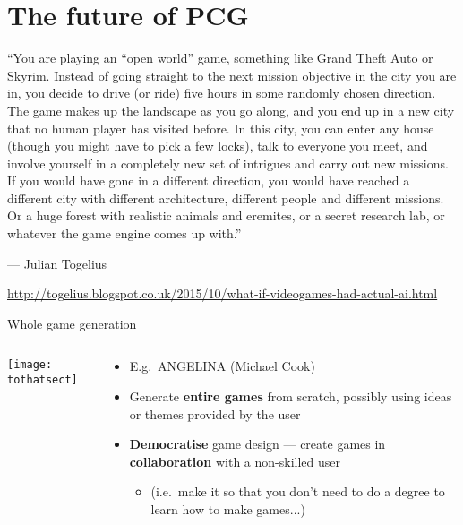 \part{The future of PCG}
\frame{\partpage}

\begin{frame}
``You are playing an ``open world'' game, something like Grand Theft Auto or Skyrim.
Instead of going straight to the next mission objective in the city you are in,
you decide to drive (or ride) five hours in some randomly chosen direction.
The game makes up the landscape as you go along, and you end up in a new city that no human player has visited before.
In this city, you can enter any house (though you might have to pick a few locks), talk to everyone you meet,
and involve yourself in a completely new set of intrigues and carry out new missions.
If you would have gone in a different direction, you would have reached a different city
with different architecture, different people and different missions.
Or a huge forest with realistic animals and eremites, or a secret research lab, or whatever the game engine comes up with.''

--- Julian Togelius

{\tiny\url{http://togelius.blogspot.co.uk/2015/10/what-if-videogames-had-actual-ai.html}}
\end{frame}

\begin{frame}{Whole game generation}
	\begin{columns}
		\begin{column}{0.4\textwidth}
			\pause\texttt{[image: tothatsect]}
		\end{column}
		\begin{column}{0.55\textwidth}
			\begin{itemize}
				\pause\item E.g.\ ANGELINA (Michael Cook)
				\pause\item Generate \textbf{entire games} from scratch, possibly using ideas or themes provided by the user
				\pause\item \textbf{Democratise} game design --- create games in \textbf{collaboration} with a
					non-skilled user
					\begin{itemize}
						\pause\item (i.e.\ make it so that you don't need to do a degree to learn how to make games...)
					\end{itemize}
			\end{itemize}
		\end{column}
	\end{columns}
\end{frame}

